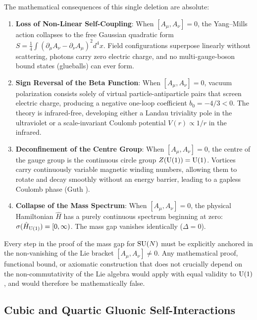 The mathematical consequences of this single deletion are absolute:
\begin{enumerate}
    \item \textbf{Loss of Non-Linear Self-Coupling}: When $[A_\mu, A_\nu] = 0$, the Yang--Mills action collapses to the free Gaussian quadratic form $S = \frac{1}{4} \int (\partial_\mu A_\nu - \partial_\nu A_\mu)^2 d^4x$. Field configurations superpose linearly without scattering, photons carry zero electric charge, and no multi-gauge-boson bound states (glueballs) can ever form.
    \item \textbf{Sign Reversal of the Beta Function}: When $[A_\mu, A_\nu] = 0$, vacuum polarization consists solely of virtual particle-antiparticle pairs that screen electric charge, producing a negative one-loop coefficient $b_0 = -4/3 < 0$. The theory is infrared-free, developing either a Landau triviality pole in the ultraviolet or a scale-invariant Coulomb potential $V(r) \propto 1/r$ in the infrared.
    \item \textbf{Deconfinement of the Centre Group}: When $[A_\mu, A_\nu] = 0$, the centre of the gauge group is the continuous circle group $Z(\mathrm{U}(1)) = \mathrm{U}(1)$. Vortices carry continuously variable magnetic winding numbers, allowing them to rotate and decay smoothly without an energy barrier, leading to a gapless Coulomb phase (Guth \cite{Guth1980}).
    \item \textbf{Collapse of the Mass Spectrum}: When $[A_\mu, A_\nu] = 0$, the physical Hamiltonian $\hat{H}$ has a purely continuous spectrum beginning at zero: $\sigma(\hat{H}_{\mathrm{U}(1)}) = [0, \infty)$. The mass gap vanishes identically ($\Delta = 0$).
\end{enumerate}

\begin{conclusion}
\label{concl:anti_dummy}
Every step in the proof of the mass gap for $\mathrm{SU}(N)$ must be explicitly anchored in the non-vanishing of the Lie bracket $[A_\mu, A_\nu] \neq 0$. Any mathematical proof, functional bound, or axiomatic construction that does not crucially depend on the non-commutativity of the Lie algebra would apply with equal validity to $\mathrm{U}(1)$, and would therefore be mathematically false.
\end{conclusion}

\subsection{Cubic and Quartic Gluonic Self-Interactions}
\label{subsec:cubic_quartic_vertices}

